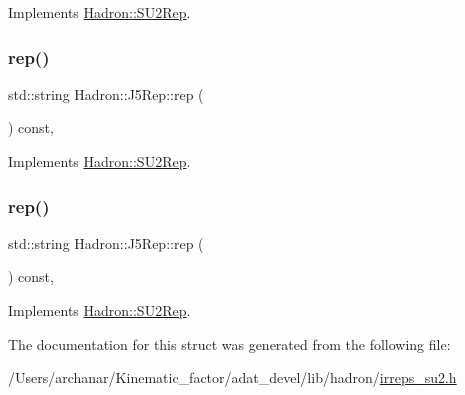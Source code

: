 Implements \mbox{\hyperlink{structHadron_1_1SU2Rep_a4feae466a054ad829ef37a71b46667b8}{Hadron\+::\+S\+U2\+Rep}}.

\mbox{\label{structHadron_1_1J5Rep_a21db8a3fe2ed5b61d05e4e9b0082fc37}} 
\subsubsection{\texorpdfstring{rep()}{rep()}\hspace{0.1cm}{\footnotesize\ttfamily [1/2]}}
{\footnotesize\ttfamily std\+::string Hadron\+::\+J5\+Rep\+::rep (\begin{DoxyParamCaption}{ }\end{DoxyParamCaption}) const\hspace{0.3cm}{\ttfamily [inline]}, {\ttfamily [virtual]}}



Implements \mbox{\hyperlink{structHadron_1_1SU2Rep_a97c63ec12042453d3ac8e9ea612b2743}{Hadron\+::\+S\+U2\+Rep}}.

\mbox{\label{structHadron_1_1J5Rep_a21db8a3fe2ed5b61d05e4e9b0082fc37}} 
\subsubsection{\texorpdfstring{rep()}{rep()}\hspace{0.1cm}{\footnotesize\ttfamily [2/2]}}
{\footnotesize\ttfamily std\+::string Hadron\+::\+J5\+Rep\+::rep (\begin{DoxyParamCaption}{ }\end{DoxyParamCaption}) const\hspace{0.3cm}{\ttfamily [inline]}, {\ttfamily [virtual]}}



Implements \mbox{\hyperlink{structHadron_1_1SU2Rep_a97c63ec12042453d3ac8e9ea612b2743}{Hadron\+::\+S\+U2\+Rep}}.



The documentation for this struct was generated from the following file\+:\begin{DoxyCompactItemize}
\item 
/\+Users/archanar/\+Kinematic\+\_\+factor/adat\+\_\+devel/lib/hadron/\mbox{\hyperlink{lib_2hadron_2irreps__su2_8h}{irreps\+\_\+su2.\+h}}\end{DoxyCompactItemize}
